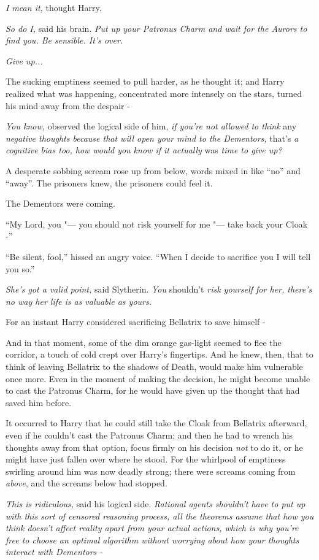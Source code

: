 \emph{I mean it,} thought Harry.

\emph{So do I,} said his brain. \emph{Put up your Patronus Charm and
wait for the Aurors to find you. Be sensible. It's over.}

\emph{Give up...}

The sucking emptiness seemed to pull harder, as he thought it; and Harry
realized what was happening, concentrated more intensely on the stars,
turned his mind away from the despair -

\emph{You know,} observed the logical side of him, \emph{if you're not
allowed to think} any \emph{negative thoughts because that will open
your mind to the Dementors,} that's \emph{a cognitive bias too, how
would you know if it actually} was \emph{time to give up?}

A desperate sobbing scream rose up from below, words mixed in like
``no'' and ``away''. The prisoners knew, the prisoners could feel it.

The Dementors were coming.

``My Lord, you "--- you should not risk yourself for me "--- take back your
Cloak -''

``Be silent, fool,'' hissed an angry voice. ``When I decide to sacrifice
you I will tell you so.''

\emph{She's got a valid point,} said Slytherin. \emph{You} shouldn't
\emph{risk yourself for her, there's no way her life is as valuable as
yours.}

For an instant Harry considered sacrificing Bellatrix to save himself -

And in that moment, some of the dim orange gas-light seemed to flee the
corridor, a touch of cold crept over Harry's fingertips. And he knew,
then, that to think of leaving Bellatrix to the shadows of Death, would
make him vulnerable once more. Even in the moment of making the
decision, he might become unable to cast the Patronus Charm, for he
would have given up the thought that had saved him before.

It occurred to Harry that he could still take the Cloak from Bellatrix
afterward, even if he couldn't cast the Patronus Charm; and then he had
to wrench his thoughts away from that option, focus firmly on his
decision \emph{not} to do it, or he might have just fallen over where he
stood. For the whirlpool of emptiness swirling around him was now deadly
strong; there were screams coming from \emph{above}, and the screams
below had stopped.

\emph{This is ridiculous,} said his logical side. \emph{Rational agents
shouldn't have to put up with this sort of censored reasoning process,
all the theorems assume that how you think doesn't affect reality apart
from your actual actions, which is why you're free to choose an optimal
algorithm without worrying about how your thoughts interact with
Dementors -}

